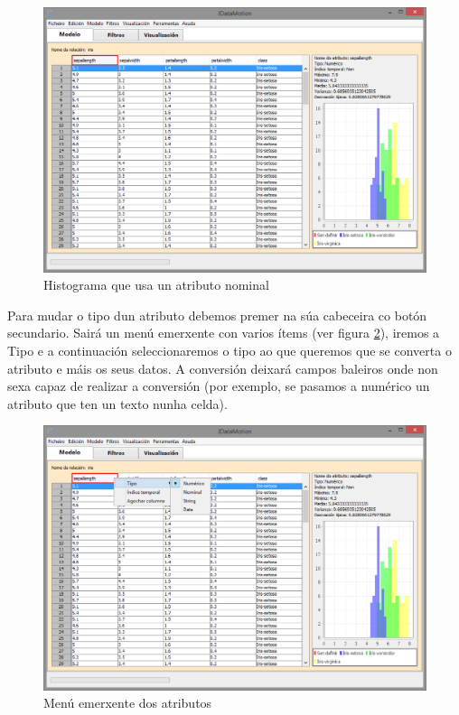 \begin{figure}
\centering
\includegraphics[width=\textwidth,height=\textheight,keepaspectratio]{figuras/histogramaNominal}
\caption{Histograma que usa un atributo nominal}
\label{histogramaNominal}
\end{figure}

Para mudar o tipo dun atributo debemos premer na súa cabeceira co botón secundario. Sairá un menú emerxente con varios ítems (ver figura \ref{menuAtributo}), iremos a Tipo e a continuación seleccionaremos o tipo ao que queremos que se converta o atributo e máis os seus datos. A conversión deixará campos baleiros onde non sexa capaz de realizar a conversión (por exemplo, se pasamos a numérico un atributo que ten un texto nunha celda).

\begin{figure}
\centering
\includegraphics[width=\textwidth,height=\textheight,keepaspectratio]{figuras/menuAtributo}
\caption{Menú emerxente dos atributos}
\label{menuAtributo}
\end{figure}

